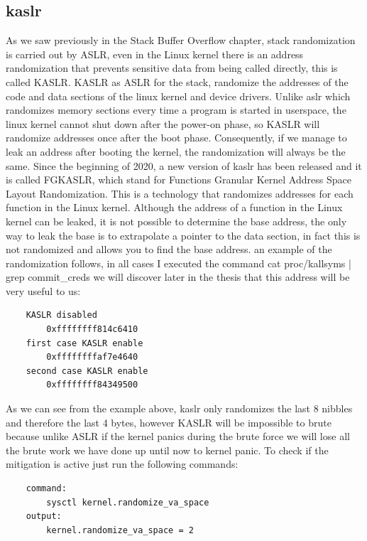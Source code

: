 \documentclass{report}
\begin{document}
    \subsection{kaslr}

    As we saw previously in the Stack Buffer Overflow chapter, stack randomization is carried out by ASLR, even in the Linux kernel there is an address randomization that prevents sensitive data from being called directly, this is called KASLR. \newline
    KASLR as ASLR for the stack, randomize the addresses  of the code and data sections of the linux kernel and device drivers.\newline
    Unlike aslr which randomizes memory sections every time a program is started in userspace, the linux kernel cannot shut down after the power-on phase, so KASLR will randomize addresses once after the boot phase.\newline
    Consequently, if we manage to leak an address after booting the kernel, the randomization will always be the same.\newline
    Since the beginning of 2020, a new version of kaslr has been released and it is called FGKASLR, which stand for Functions Granular Kernel Address Space Layout Randomization.\newline 
    This is a technology that randomizes addresses for each function in the Linux kernel.\newline 
    Although the address of a function in the Linux kernel can be leaked, it is not possible to determine the base address, the only way to leak the base is to extrapolate a pointer to the data section, in fact this is not randomized and allows you to find the base address.\newline
    an example of the randomization follows, in all cases I executed the command cat proc/kallsyms | grep commit\_creds we will discover later in the thesis that this address will be very useful to us:\newline
    \begin{verbatim}
    KASLR disabled 
        0xffffffff814c6410
    first case KASLR enable  
        0xffffffffaf7e4640
    second case KASLR enable
        0xffffffff84349500
    \end{verbatim}
    As we can see from the example above, kaslr only randomizes the last 8 nibbles and therefore the last 4 bytes, however KASLR will be impossible to brute because unlike ASLR if the kernel panics during the brute force we will lose all the brute work we have done up until now to kernel panic.\newline
    To check if the mitigation is active just run the following commands: \newline
    \begin{verbatim}
    command:
        sysctl kernel.randomize_va_space                  
    output:
        kernel.randomize_va_space = 2

    \end{verbatim}
    \clearpage
\end{document}
